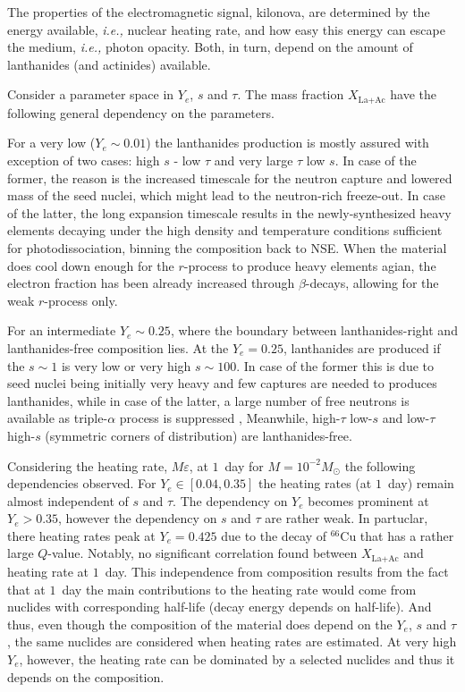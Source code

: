 \documentclass[11pt,a4paper,headinclude=true,DIV=14,BCOR=8mm,chapterprefix,listof=totoc,twoside,openright,abstracton]{scrbook}
\begin{document}
The properties of the electromagnetic signal, kilonova, are determined by the energy available, \textit{i.e.,} nuclear heating rate, and how easy this energy can escape the medium, \textit{i.e.,} photon opacity. Both, in turn, depend on the amount of lanthanides (and actinides) available. 

Consider a parameter space in $Y_e$, $s$ and $\tau$. The mass fraction $X_{\text{La}+\text{Ac}}$ have the following general dependency on the parameters. 

For a very low ($Y_e \sim 0.01$) the lanthanides production is mostly assured with exception of two cases: high $s$ - low $\tau$ and very large $\tau$ low $s$. In case of the former, the reason is the increased timescale for the neutron capture and lowered mass of the seed nuclei, which might lead to the neutron-rich freeze-out. In case of the latter, the long expansion timescale results in the newly-synthesized heavy elements decaying under the high density and temperature conditions sufficient for photodissociation, binning the composition back to NSE. When the material does cool down enough for the $r$-process to produce heavy elements agian, the electron fraction has been already increased through $\beta$-decays, allowing for the weak $r$-process only. 

For an intermediate $Y_e \sim 0.25$, where the boundary between lanthanides-right and lanthanides-free composition lies. At the $Y_e=0.25$, lanthanides are produced if the $s \sim 1$ is very low or very high $s \sim 100$. In case of the former this is due to seed nuclei being initially very heavy and few captures are needed to produces lanthanides, while in case of the latter, a large number of free neutrons is available as triple-$\alpha$ process is suppressed \cite{Hoffman et al., 1997}, Meanwhile, high-$\tau$ low-$s$ and low-$\tau$ high-$s$ (symmetric corners of distribution) are lanthanides-free. 

Considering the heating rate, $M\varepsilon$, at $1$~day for $M=10^{-2}M_{\odot}$ the following dependencies observed.
For $Y_e\in[0.04,0.35]$ the heating rates (at $1$~day) remain almost independent of $s$ and $\tau$. The dependency on $Y_e$ becomes prominent at $Y_e>0.35$, however the dependency on $s$ and $\tau$ are rather weak. In partuclar, there heating rates peak at $Y_e=0.425$ due to the decay of $^{66}$Cu that has a rather large $Q$-value.
Notably, no significant correlation found between $X_{\text{La}+\text{Ac}}$ and heating rate at $1$~day. This independence from composition results from the fact that at $1$~day the main contributions to the heating rate would come from nuclides with corresponding half-life (decay energy depends on half-life). And thus, even though the composition of the material does depend on the $Y_e$, $s$ and $\tau$, the same nuclides are considered when heating rates are estimated. At very high $Y_e$, however, the heating rate can be dominated by a selected nuclides and thus it depends on the composition.
\end{document}

